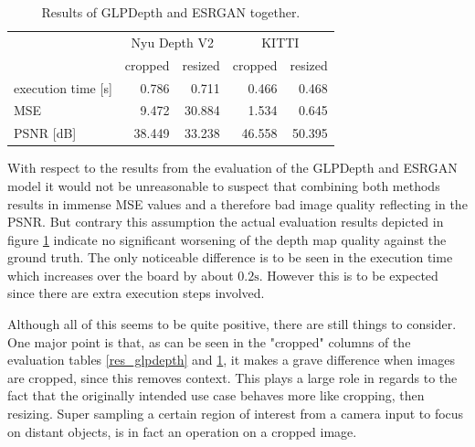 \begin{table}[ht!]
    \begin{center}
        \begin{tabular}{ l | r r r r }
                                & \multicolumn{2}{c}{Nyu Depth V2}  & \multicolumn{2}{c}{KITTI} \\
                                & cropped   & resized               & cropped   & resized       \\
            \hline
            execution time [s]  & 0.786     & 0.711                 & 0.466     & 0.468         \\
            MSE                 & 9.472     & 30.884                & 1.534     & 0.645         \\
            PSNR [dB]           & 38.449    & 33.238                & 46.558    & 50.395        \\
        \end{tabular}
        \caption{Results of GLPDepth and ESRGAN together.} \label{res_general}
    \end{center}
\end{table}

With respect to the results from the evaluation of the GLPDepth and ESRGAN model it would not be unreasonable to suspect that combining both methods results in immense MSE values and a therefore bad image quality reflecting in the PSNR. But contrary this assumption the actual evaluation results depicted in figure \ref*{res_general} indicate no significant worsening of the depth map quality against the ground truth.
The only noticeable difference is to be seen in the execution time which increases over the board by about $0.2\mathrm{s}$. However this is to be expected since there are extra execution steps involved.

Although all of this seems to be quite positive, there are still things to consider. One major point is that, as can be seen in the "cropped" columns of the evaluation tables \ref*{res_glpdepth} and \ref*{res_general}, it makes a grave difference when images are cropped, since this removes context. This plays a large role in regards to the fact that the originally intended use case behaves more like cropping, then resizing. Super sampling a certain region of interest from a camera input to focus on distant objects, is in fact an operation on a cropped image.

